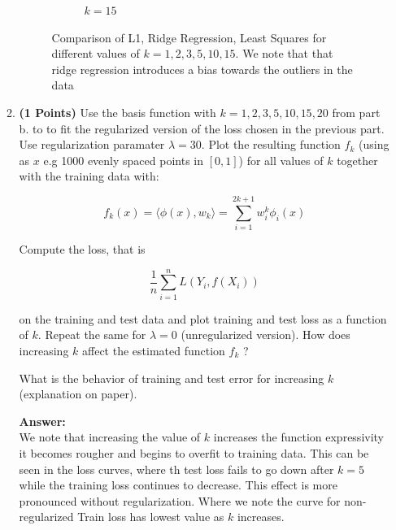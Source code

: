 \documentclass{./tufte-handout}
\begin{document}
\begin{enumerate}[(a)]
\begin{enumerate}
\begin{figure}[!ht]
\begin{subfigure}[b]{.5\textwidth}
          \caption{$k=15$}
        \end{subfigure}
        \hfill
        \caption{Comparison of L1,  Ridge Regression, Least Squares for different values of $k=1,2,3,5,10,15$. We note 
        that that ridge regression introduces a bias towards the outliers in the data}
    \end{figure}
    \FloatBarrier
    \item \textbf{(1 Points)} Use the basis function with $k=1, 2, 3, 5, 10, 15, 20$ from part b. to 
   to fit the regularized version of the loss chosen in the previous part. Use regularization paramater 
   $\lambda = 30$. Plot the resulting function $f_k$ (using as $x$ e.g 1000 evenly spaced points in $[0, 1]$) 
   for all values of $k$ together with the training data with: 

   \begin{equation}
        f_k(x)  = \langle \phi(x), w_k \rangle = \sum_{i=1}^{2k+1} w_i^k \phi_{i}(x)
   \end{equation}

   Compute the loss, that is 

   \begin{equation}
    \frac{1}{n}  \sum_{i=1}^n L(Y_i, f(X_i))
   \end{equation}

   on the training and test data and plot training and test loss as a function of $k$.
   Repeat the same for $\lambda =0$ (unregularized version). How does increasing 
   $k$ affect the estimated function $f_k$ ? 

   What is the behavior of training and test error for increasing 
   $k$ (explanation on paper). 

   \textbf{Answer:} \\

   We note that increasing the value of $k$ increases the function expressivity it 
   becomes rougher and begins to overfit to training data. This can be seen in 
   the loss curves, where th test loss fails to go down after $k=5$ while the training
   loss continues to decrease. This effect is more pronounced without regularization. 
   Where we note the curve for non-regularized Train loss has lowest value as $k$ 
   increases.
   

\end{enumerate}
\end{enumerate}
\end{document}
